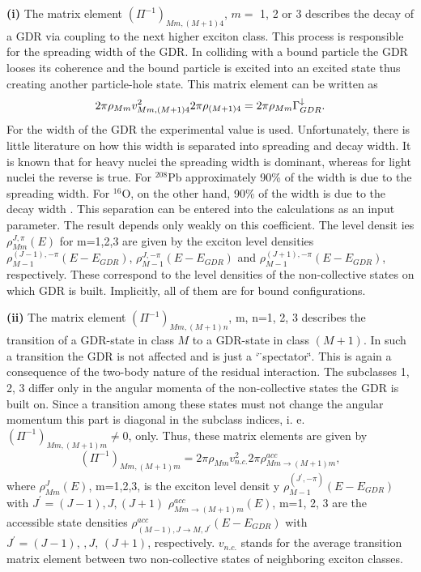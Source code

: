 \smallskip \textbf{(i)} The matrix element $(\Pi^{-1})_{Mm,(M+1)4}$, $m=$ 1,
2 or 3 describes the decay of a GDR via coupling to the next higher exciton
class. This process is responsible for the spreading width of the GDR. In
colliding with a bound particle the GDR looses its coherence and the bound
particle is excited into an excited state thus creating another
particle-hole state. This matrix element can be written as 
\begin{equation}
2\pi\rho_{Mm}v_{Mm,(M+1)4}^{2}2\pi\rho_{(M+1)4}=2\pi\rho_{Mm}\Gamma_{GDR}^{%
\downarrow}.
\end{equation}
For the width of the GDR the experimental value is used. Unfortunately,
there is little literature on how this width is separated into spreading and
decay width. It is known that for heavy nuclei the spreading width is
dominant, whereas for light nuclei the reverse is true. For $^{208}$Pb
approximately 90\% of the width is due to the spreading width. For $^{16}$O,
on the other hand, 90\% of the width is due to the decay width \cite{BBB83}.
This separation can be entered into the calculations as an input parameter.
The result depends only weakly on this coefficient. The level densit%
ies $\rho_{Mm}^{J,\pi}(E)$ for m=1,2,3 are given by
the exciton level densities $\rho_{M-1}^{(J-1),-\pi}(E-E_{GDR})$, $%
\rho_{M-1}^{J,-\pi}(E-E_{GDR})$ and $\rho_{M-1}^{(J+1),-\pi}(E-E_{GDR})$,
respectively. These correspond to the level densities of the non-collective
states on which GDR is built. Implicitly, all of them are for bound
configurations.

\smallskip \textbf{(ii)} The matrix element $(\Pi^{-1})_{Mm,(M+1)n}$, m,
n=1, 2, 3 describes the transition of a GDR-state in class $M$ to a
GDR-state in class $(M+1)$. In such a transition the GDR is not affected and
is just a \char`%
\"{}spectator\char`\"{}. This is again a consequence of the two-body nature
of the residual interaction. The subclasses 1, 2, 3 differ only in the
angular momenta of the non-collective states the GDR is built on. Since a
transition among these states must not change the angular momentum this part
is diagonal in the subclass indices, i. e. $(\Pi^{-1})_{Mm,(M+1)m}\not=0$,
only. Thus, these matrix elements are given by 
\begin{equation}
(\Pi^{-1})_{Mm,(M+1)m}=2\pi\rho_{Mm}v_{n.c.}^{2}2\pi\rho_{Mm%
\rightarrow(M+1)m}^{acc},
\end{equation}
where $\rho_{Mm}^{J}(E)$, m=1,2,3, is the exciton level densit%
y $\rho_{M-1}^{(J^{\prime},-\pi)}(E-E_{GDR})$
with $J^{\prime}=(J-1),J,(J+1)$ $\rho_{Mm\rightarrow(M+1)m}^{acc}(E)$, m=1,
2, 3 are the accessible state densities $\rho_{(M-1),J\rightarrow
M,J^{\prime}}^{acc}(E-E_{GDR})$ with $J^{\prime}=(J-1),\,,J,\,(J+1)$,
respectively. $v_{n.c.}$ stands for the average transition matrix element
between two non-collective states of neighboring exciton classes.

